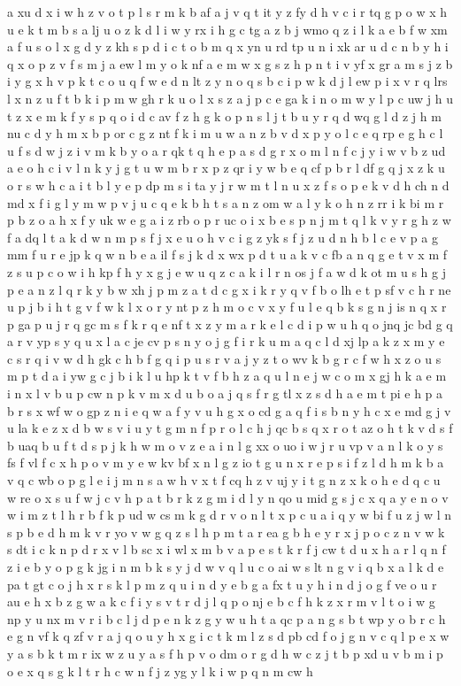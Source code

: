 \documentclass{article}
\begin{document}
a xu d x i w h z v o t p l s r m k b af a j v q t it y z fy d h v c i r tq g p o w x h u e k t m b s a lj u o z k d l i w y rx i h g c tg a z b j wmo q z i l k a e b f w xm a f u s o l x g d y z kh s p d i c t o b m q x yn u rd tp u n i xk ar u d c n b y h i q x o p z v f s m j a ew l m y o k nf a e m w x g s z h p n t i v yf x gr a m s j z b i y g x h v p k t c o u q f w e d n lt z y n o q s b c i p w k d j l ew p i x v r q lrs l x n z u f t b k i p m w gh r k u o l x s z a j p c e ga k i n o m w y l p c uw j h u t z x e m k f y s p q o i d c av f z h g k o p n s l j t b u y r q d wq g l d z j h m nu c d y h m x b p or c g z nt f k i m u w a n z b v d x p y o l c e q rp e g h c l u f s d w j z i v m k b y o a r qk t q h e p a s d g r x o m l n f c j y i w v b z ud a e o h c i v l n k y j g t u w m b r x p z qr i y w b e q cf p b r l df g q j x z k u o r s w h c a i t b l y e p dp m s i ta y j r w m t l n u x z f s o p e k v d h ch n d md x f i g l y m w p v j u c q e k b h t s a n z om w a l y k o h n z rr i k bi m r p b z o a h x f y uk w e g a i z rb o p r uc o i x b e s p n j m t q l k v y r g h z w f a dq l t a k d w n m p s f j x e u o h v c i g z yk s f j z u d n h b l c e v p a g mm f u r e jp k q w n b e a il f s j k d x wx p d t u a k v c fb a n q g e t v x m f z s u p c o w i h kp f h y x g j e w u q z c a k i l r n os j f a w d k ot m u s h g j p e a n z l q r k y b w xh j p m z a t d c g x i k r y q v f b o lh e t p sf v c h r ne u p j b i h t g v f w k l x o r y nt p z h m o c v x y f u l e q b k s g n j is n q x r p ga p u j r q gc m s f k r q e nf t x z y m a r k e l c d i p w u h q o jnq jc bd g q a r v yp s y q u x l a c je cv p s n y o j g f i r k u m a q c l d xj lp a k z x m y e c s r q i v w d h gk c h b f g q i p u s r v a j y z t o wv k b g r c f w h x z o u s m p t d a i yw g c j b i k l u hp k t v f b h z a q u l n e j w c o m x gj h k a e m i n x l v b u p cw n p k v m x d u b o a j q s f r g tl x z s d h a e m t pi e h p a b r s x wf w o gp z n i e q w a f y v u h g x o cd g a q f i s b n y h c x e md g j v u la k e z x d b w s v i u y t g m n f p r o l c h j qc b s q x r o t az o h t k v d s f b uaq b u f t d s p j k h w m o v z e a i n l g xx o uo i w j r u vp v a n l k o y s fs f vl f c x h p o v m y e w kv bf x n l g z io t g u n x r e p s i f z l d h m k b a v q c wb o p g l e i j m n s a w h v x t f cq h z v uj y i t g n z x k o h e d q c u w re o x s u f w j c v h p a t b r k z g m i d l y n qo u mid g s j c x q a y e n o v w i m z t l h r b f k p ud w cs m k g d r v o n l t x p c u a i q y w bi f u z j w l n s p b e d h m k v r yo v w g q z s l h p m t a r ea g b h e y r x j p o c z n v w k s dt i c k n p d r x v l b sc x i wl x m b v a p e s t k r f j cw t d u x h a r l q n f z i e b y o p g k jg i n m b k s y j d w v q l u c o ai w s lt n g v i q b x a l k d e pa t gt c o j h x r s k l p m z q u i n d y e b g a fx t u y h i n d j o g f ve o u r au e h x b z g w a k c f i y s v t r d j l q p o nj e b c f h k z x r m v l t o i w g np y u nx m v r i b c l j d p e n k z g y w u h t a qc p a n g s b t wp y o b r c h e g n vf k q zf v r a j q o u y h x g i c t k m l z s d pb cd f o j g n v c q l p e x w y a s b k t m r ix w z u y a s f h p v o dm o r g d h w c z j t b p xd u v b m i p o e x q s g k l t r h c w n f j z yg y l k i w p q n m cw h 
\end{document}
